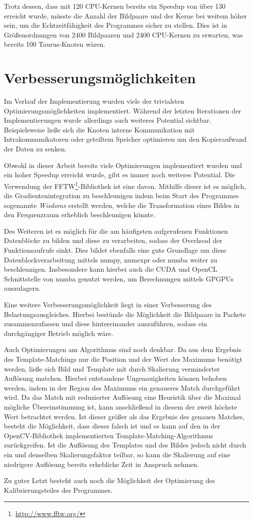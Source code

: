 Trotz dessen, dass mit 120 \gls{CPU}-Kernen bereits ein Speedup von über 130 erreicht wurde, müsste die Anzahl der Bildpaare und der Kerne bei weitem höher sein, um die Echtzeitfähigkeit des Programmes sicher zu stellen. Dies ist in Größenordnungen von 2400 Bildpaaren und 2400 \gls{CPU}-Kernen zu erwarten, was bereits 100 Taurus-Knoten wären. 

\section{Verbesserungsmöglichkeiten}

Im Verlauf der Implementierung wurden viele der trivialsten Optimierungsmöglichkeiten implementiert. Während der letzten Iterationen der Implementierungen wurde allerdings auch weiteres Potential sichtbar. Beispielsweise ließe sich die Knoten interne Kommunikation mit Intrakommunikatoren oder geteiltem Speicher optimieren um den Kopieraufwand der Daten zu senken. 

Obwohl in dieser Arbeit bereits viele Optimierungen implementiert wurden und ein hoher Speedup erreicht wurde, gibt es immer noch weiteres Potential. Die Verwendung der FFTW\footnote{\url{http://www.fftw.org/}}-Bibliothek ist eine davon. Mithilfe dieser ist es möglich, die Gradientenintegration zu beschleunigen indem beim Start des Programmes sogenannte \textit{Wisdoms} erstellt werden, welche die Transformation eines Bildes in den Frequenzraum erheblich beschleunigen könnte. 

Des Weiteren ist es möglich für die am häufigsten aufgerufenen Funktionen Datenblöcke zu bilden und diese zu verarbeiten, sodass der Overhead der Funktionsaufrufe sinkt. Dies bildet ebenfalls eine gute Grundlage um diese Datenblockverarbeitung mittels numpy, numexpr oder numba weiter zu beschleunigen. Insbesondere kann hierbei auch die CUDA und OpenCL Schnittstelle von numba genutzt werden, um Berechnungen mittels \glspl{GPGPU} auszulagern. 

Eine weitere Verbesserungsmöglichkeit liegt in einer Verbesserung des Belastungsausgleiches. Hierbei bestünde die Möglichkeit die Bildpaare in Packete zusammenzufassen und diese hintereinander auszuführen, sodass ein durchgängiger Betrieb möglich wäre. 

Auch Optimierungen am Algorithmus sind noch denkbar. Da aus dem Ergebnis des Template-Matchings nur die Position und der Wert des Maximums benötigt werden, ließe sich Bild und Template mit durch Skalierung verminderter Auflösung matchen. Hierbei entstandene Ungenauigkeiten können behoben werden, indem in der Region des Maximums ein genaueres Match durchgeführt wird. Da das Match mit reduzierter Auflösung eine Heuristik über die Maximal mögliche Übereinstimmung ist, kann anschließend in diesem der zweit höchste Wert betrachtet werden. Ist dieser größer als das Ergebnis des genauen Matches, besteht die Möglichkeit, dass dieses falsch ist und es kann auf den in der OpenCV-Bibliothek implementierten Template-Matching-Algorithmus zurückgreifen. Ist die Auflösung des Templates und des Bildes jedoch nicht durch ein und denselben Skalierungsfaktor teilbar, so kann die Skalierung auf eine niedrigere Auflösung bereits erhebliche Zeit in Anspruch nehmen. 

Zu guter Letzt besteht auch noch die Möglichkeit der Optimierung des Kalibrierungsteiles des Programmes. 